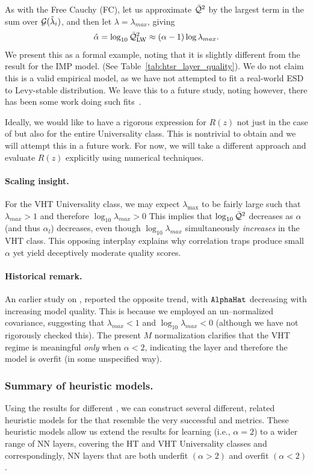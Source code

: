 As with the Free Cauchy (FC), let us approximate $\bar{\mathcal{Q}}^{2}$ by the largest term in the sum over $\mathcal{G}(\tilde{\lambda}_{i})$, and then let $\lambda=\lambda_{max}$, giving
\begin{equation} 
\label{eqn:LW_model_4} 
\hat\alpha = \log_{10} \bar{\mathcal{Q}}^{2}_{\mathrm{LW}} \approx (\alpha-1)\log\lambda_{max}   .
\end{equation}
We present this as a formal example, noting that it is slightly different from the result for the IMP model.
(See Table~\ref{tab:htsr_layer_quality}). 
We do not claim this is a valid empirical model, as we have not attempted to fit a real-world ESD to Levy-stable distribution.  
We leave this to a future study, noting however, there has been some work doing such fits~\cite{li2024exploring}.

Ideally, we would like to have a rigorous expression for $R(z)$ not just
in the case of \IdealLearning but also for the entire \FatTailed Universality class.
This is nontrivial to obtain and we will attempt this in a future work.
For now, we will take a different approach and evaluate $R(z)$ explicitly using numerical techniques.

\paragraph{Scaling insight.}
For the VHT Universality class, we may expect $\lambda_{\max}$ to be fairly large such that
$\lambda_{max}>1$ and therefore $\log_{10}\lambda_{max}>0$
This implies that  $\log_{10}\bar{\mathcal{Q}}^{2}$ decreases  as $\alpha$ (and thus $\alpha_l$) decreases, even though
$\log_{10}\lambda_{max}$ simultaneously \emph{increases} in the VHT class.
This opposing interplay explains why correlation traps produce small $\alpha$ yet yield deceptively moderate quality scores.

\paragraph{Historical remark.}
An earlier study on \ALPHAHAT, reported the opposite trend, with $\texttt{AlphaHat}$ decreasing with increasing model quality.
This is because we employed an un–normalized covariance, suggesting that $\lambda_{max}<1$ and $\log_{10}\lambda_{max}<0$
(although we have not rigorously checked this).
The present $M$ normalization clarifies that the VHT regime is meaningful \emph{only} when $\alpha<2$,
indicating the layer and therefore the model is overfit (in some unspecified way).


\subsubsection{Summary of heuristic models.}
Using the results for different \RTransforms, we can construct several different, related heuristic models for the \LayerQuality
that resemble the very successful \WW \HTSR \ALPHA and \ALPHAHAT metrics.  These heuristic models allow us extend
the \SETOL results for \Ideal learning (i.e., $\alpha=2$) to a wider range of NN layers, covering the \HTSR
HT and VHT Universality classes and correspondingly, NN layers that are both underfit $(\alpha>2)$
and overfit $(\alpha<2)$.

